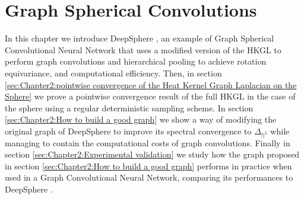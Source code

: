 

\section{Graph Spherical Convolutions}
In this chapter we introduce DeepSphere \cite{DeepSphere}, an example of Graph Spherical Convolutional Neural Network that uses a modified version of the HKGL to perform graph convolutions and hierarchical pooling to achieve rotation equivariance, and computational efficiency. Then, in section \ref{sec:Chapter2:pointwise convergence of the Heat Kernel Graph Laplacian on the Sphere} we prove a pointwise convergence result of the full HKGL in the case of the sphere using a regular deterministic sampling scheme. In section \ref{sec:Chapter2:How to build a good graph} we show a way of modifying the original graph of DeepSphere to improve its spectral convergence to $\Delta_{\mathbb S^2}$ while managing to contain the computational costs of graph convolutions. Finally in section \ref{sec:Chapter2:Experimental validation} we study how the graph proposed in section \ref{sec:Chapter2:How to build a good graph} performs in practice when used in a Graph Convolutional Neural Network, comparing its performances to DeepSphere \cite{DeepSphere}.
